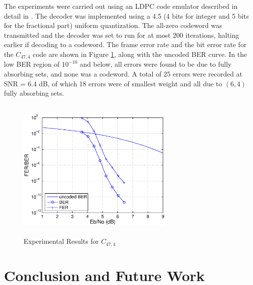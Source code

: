 
 The experiments were carried out using an LDPC code
emulator described in detail in \cite{zhang06}. The decoder was
implemented using a 4.5 (4 bits for integer and 5 bits for the
fractional part) uniform quantization. The all-zero codeword was
transmitted and the decoder was set to run for at most 200
iterations, halting earlier if decoding to a codeword. The frame
error rate and the bit error rate for the $C_{47,4}$ code are
shown in Figure \ref{expif}, along with the uncoded BER curve. In
the low BER region of $10^{-10}$ and below,
all errors were found to be due to %
fully absorbing sets, and none was a codeword. A total of 25
errors were recorded at SNR = 6.4 dB, of which 18 errors were of
smallest weight and all due to $(6,4)$ fully absorbing sets.

\vspace{0in}
\begin{figure}[h]
\center\includegraphics[keepaspectratio,width=3.0in,height=2.75in]{474_lara3.eps}
\caption{Experimental Results for $C_{47,4}$} \label{expif}
\end{figure}

\vspace{-0.00in}\section{Conclusion and Future Work}\label{conc}



